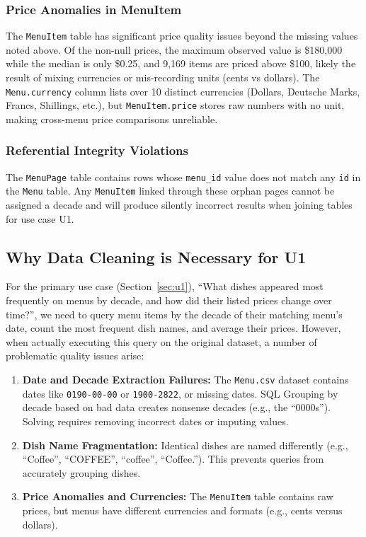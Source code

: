 \documentclass[11pt]{article}
\begin{document}
\subsubsection*{Price Anomalies in MenuItem}
The \texttt{MenuItem} table has significant price quality issues
beyond the missing values noted above. Of the non-null prices, the maximum
observed value is \$180,000 while the median is only \$0.25, and 9,169 items are
priced above \$100, likely the result of mixing currencies or mis-recording units (cents vs dollars).
The \texttt{Menu.currency} column lists over 10 distinct currencies 
(Dollars, Deutsche Marks, Francs, Shillings, etc.), but \texttt{MenuItem.price} stores 
raw numbers with no unit, making cross-menu price comparisons unreliable.

\subsubsection*{Referential Integrity Violations}
The \texttt{MenuPage} table contains rows whose \texttt{menu\_id} value
does not match any \texttt{id} in the \texttt{Menu} table. Any \texttt{MenuItem} 
linked through these orphan pages cannot be assigned a decade and will produce silently 
incorrect results when joining tables for use case U1.

\subsection{Why Data Cleaning is Necessary for U1}  %
\label{sec:dq_necessary}

For the primary use case (Section~\ref{sec:u1}), ``What dishes appeared most
frequently on menus by decade, and how did their listed prices change over time?'',
we need to query menu items by the decade of their matching menu's date, count the
most frequent dish names, and average their prices. However, when actually executing
this query on the original dataset, a number of problematic quality issues arise:

\begin{enumerate}
    \item \textbf{Date and Decade Extraction Failures:} The \texttt{Menu.csv}
          dataset contains dates like \texttt{0190-00-00} or \texttt{1900-2822},
          or missing dates. SQL Grouping by decade based on bad data creates nonsense
          decades (e.g., the ``0000s''). Solving requires removing incorrect dates
          or imputing values.
    \item \textbf{Dish Name Fragmentation:} Identical dishes are named differently
          (e.g., ``Coffee'', ``COFFEE'', ``coffee'', ``Coffee.''). This prevents
          queries from accurately grouping dishes.
    \item \textbf{Price Anomalies and Currencies:} The \texttt{MenuItem} table
          contains raw prices, but menus have different currencies and formats
          (e.g., cents versus dollars).
\end{enumerate}
\end{document}
